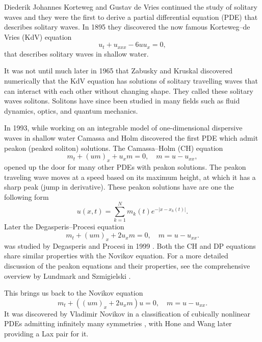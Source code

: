 \documentclass[english,master]{liumaiex}
\theoremstyle{plain}
\theoremstyle{definition}
\begin{document}
Diederik Johannes Korteweg and Gustav de Vries continued the study of solitary waves and they were the first to derive a partial differential equation (PDE) that describes solitary waves. In 1895 they discovered the now famous Korteweg--de Vries (KdV) equation
\begin{equation}
	u_t + u_{xxx} - 6uu_x = 0,
\end{equation}
that describes solitary waves in shallow water.

It was not until much later in 1965 that Zabusky and Kruskal \cite{Zabusky1965} discovered numerically that the KdV equation has solutions of solitary travelling waves that can interact with each other without changing shape. They called these solitary waves solitons. Solitons have since been studied in many fields such as fluid dynamics, optics, and quantum mechanics.

In 1993\cite{Camassa_1993}, while working on an integrable model of one-dimensional dispersive waves in shallow water Camassa and Holm discovered the first PDE which admit peakon (peaked soliton) solutions. The Camassa--Holm (CH) equation
\begin{equation} \label{eq:CH}
	m_t + (um)_x + u_xm = 0,\quad m = u - u_{xx},
\end{equation}
opened up the door for many other PDEs with peakon solutions. The peakon traveling wave moves at a speed based on its maximum height, at which
it has a sharp peak (jump in derivative). These peakon solutions have are one the following form
\begin{equation} \label{eq:peakon}
	u(x, t) = \sum_{k = 1}^{N} m_k(t) e^{-|x - x_k(t)|}.
\end{equation}
Later the Degasperis--Procesi equation
\begin{equation} \label{eq:DP}
	m_t + (um)_x + 2u_xm = 0,\quad m = u - u_{xx}.
\end{equation}
was studied by Degasperis and Procesi in 1999 \cite{Degasperis_1999}. Both the CH and DP equations share similar properties with the Novikov equation. For a more detailed discussion of the peakon equations and their properties, see the comprehensive overview by Lundmark and Szmigielski \cite{Lundmark_2022}.

This brings us back to the Novikov equation
\begin{equation} \label{eq:Novikov_high_freq}
	m_t + ((um)_x + 2u_xm) u = 0,\quad m = u - u_{xx}.
\end{equation}
It was discovered by Vladimir Novikov in a classification of cubically nonlinear PDEs admitting infinitely many symmetries \cite{Novikov_2009}, with Hone and Wang \cite{Hone2008} later providing a Lax pair for it.
\end{document}
